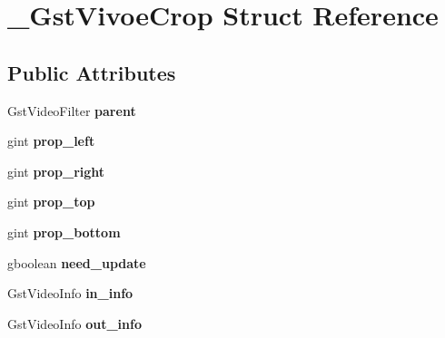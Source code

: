 \hypertarget{struct__GstVivoeCrop}{}\section{\+\_\+\+Gst\+Vivoe\+Crop Struct Reference}
\label{struct__GstVivoeCrop}
\subsection*{Public Attributes}
\begin{DoxyCompactItemize}
\item 
Gst\+Video\+Filter {\bfseries parent}\hypertarget{struct__GstVivoeCrop_a6e24eb9a03c6389b8ccbdbeead034d22}{}\label{struct__GstVivoeCrop_a6e24eb9a03c6389b8ccbdbeead034d22}

\item 
gint {\bfseries prop\+\_\+left}\hypertarget{struct__GstVivoeCrop_aa72179c1b571ff76d90c3e1446828550}{}\label{struct__GstVivoeCrop_aa72179c1b571ff76d90c3e1446828550}

\item 
gint {\bfseries prop\+\_\+right}\hypertarget{struct__GstVivoeCrop_acde56433a23720b447e04753f5cd0cc3}{}\label{struct__GstVivoeCrop_acde56433a23720b447e04753f5cd0cc3}

\item 
gint {\bfseries prop\+\_\+top}\hypertarget{struct__GstVivoeCrop_a32b876f745b44f2215ab7ae53ea93f5b}{}\label{struct__GstVivoeCrop_a32b876f745b44f2215ab7ae53ea93f5b}

\item 
gint {\bfseries prop\+\_\+bottom}\hypertarget{struct__GstVivoeCrop_aa5edfa77ba644695bf35bd103209a7a4}{}\label{struct__GstVivoeCrop_aa5edfa77ba644695bf35bd103209a7a4}

\item 
gboolean {\bfseries need\+\_\+update}\hypertarget{struct__GstVivoeCrop_afd974f2ff88381575a1be6045ec783f4}{}\label{struct__GstVivoeCrop_afd974f2ff88381575a1be6045ec783f4}

\item 
Gst\+Video\+Info {\bfseries in\+\_\+info}\hypertarget{struct__GstVivoeCrop_a7ab163a358805fd35984a15fe3f83855}{}\label{struct__GstVivoeCrop_a7ab163a358805fd35984a15fe3f83855}

\item 
Gst\+Video\+Info {\bfseries out\+\_\+info}\hypertarget{struct__GstVivoeCrop_a8e39c71ea4ef8c07a77ca3d266dab9c7}{}\label{struct__GstVivoeCrop_a8e39c71ea4ef8c07a77ca3d266dab9c7}


\end{DoxyCompactItemize}
